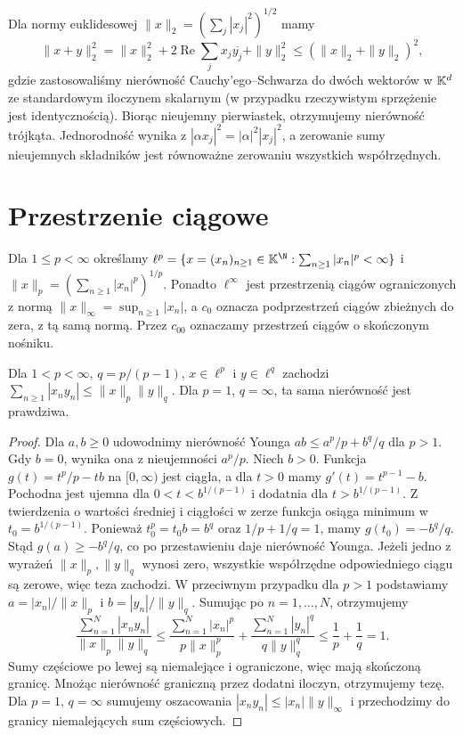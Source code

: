 Dla normy euklidesowej $\|x\|_2=(\sum_j|x_j|^2)^{1/2}$
mamy
\[
 \|x+y\|_2^2
 =\|x\|_2^2+2\operatorname{Re}\sum_j x_j\overline{y_j}
  +\|y\|_2^2
 \le(\|x\|_2+\|y\|_2)^2,
\]
gdzie zastosowaliśmy nierówność Cauchy'ego--Schwarza
do dwóch wektorów w $\mathbb K^d$ ze standardowym iloczynem skalarnym
(w przypadku rzeczywistym sprzężenie jest identycznością).
Biorąc nieujemny pierwiastek, otrzymujemy nierówność trójkąta.
Jednorodność wynika z $|\alpha x_j|^2=|\alpha|^2|x_j|^2$,
a zerowanie sumy nieujemnych składników jest równoważne
zerowaniu wszystkich współrzędnych.

\section{Przestrzenie ciągowe}

\begin{definicja}
\label{def:sequence-spaces12}
Dla $1\le p<\infty$ określamy
$\ell^p=\{x=(x_n)_{n\ge1}\in\K^{\N}:\sum_{n\ge1}|x_n|^p<\infty\}$
i $\|x\|_p=(\sum_{n\ge1}|x_n|^p)^{1/p}$.
Ponadto $\ell^\infty$ jest przestrzenią ciągów ograniczonych
z normą $\|x\|_\infty=\sup_{n\ge1}|x_n|$, a $c_0$ oznacza
podprzestrzeń ciągów zbieżnych do zera, z tą samą normą.
Przez $c_{00}$ oznaczamy przestrzeń ciągów o skończonym nośniku.
\end{definicja}

\begin{lemat}
\label{lem:holder-seq12}
Dla $1<p<\infty$, $q=p/(p-1)$, $x\in\ell^p$ i $y\in\ell^q$
zachodzi
$\sum_{n\ge1}|x_ny_n|\le\|x\|_p\|y\|_q$.
Dla $p=1$, $q=\infty$, ta sama nierówność jest prawdziwa.
\end{lemat}
\begin{proof}
Dla $a,b\ge0$ udowodnimy nierówność Younga
$ab\le a^p/p+b^q/q$ dla $p>1$. Gdy $b=0$, wynika ona z
nieujemności $a^p/p$. Niech $b>0$. Funkcja
$g(t)=t^p/p-tb$ na $[0,\infty)$ jest ciągła, a dla $t>0$
mamy $g'(t)=t^{p-1}-b$. Pochodna jest ujemna dla
$0<t<b^{1/(p-1)}$ i dodatnia dla $t>b^{1/(p-1)}$.
Z twierdzenia o wartości średniej i ciągłości w zerze
funkcja osiąga minimum w $t_0=b^{1/(p-1)}$.
Ponieważ $t_0^p=t_0b=b^q$ oraz $1/p+1/q=1$,
mamy $g(t_0)=-b^q/q$. Stąd $g(a)\ge-b^q/q$,
co po przestawieniu daje nierówność Younga.
Jeżeli jedno z wyrażeń $\|x\|_p,\|y\|_q$ wynosi zero,
wszystkie współrzędne odpowiedniego ciągu są zerowe,
więc teza zachodzi. W przeciwnym przypadku dla $p>1$
podstawiamy $a=|x_n|/\|x\|_p$ i $b=|y_n|/\|y\|_q$.
Sumując po $n=1,\ldots,N$, otrzymujemy
\[
 \frac{\sum_{n=1}^N|x_ny_n|}{\|x\|_p\|y\|_q}
 \le\frac{\sum_{n=1}^N|x_n|^p}{p\|x\|_p^p}
 +\frac{\sum_{n=1}^N|y_n|^q}{q\|y\|_q^q}
 \le\frac1p+\frac1q=1.
\]
Sumy częściowe po lewej są niemalejące i ograniczone,
więc mają skończoną granicę. Mnożąc nierówność graniczną
przez dodatni iloczyn, otrzymujemy tezę.
Dla $p=1$, $q=\infty$ sumujemy oszacowania
$|x_ny_n|\le |x_n|\|y\|_\infty$ i przechodzimy do granicy
niemalejących sum częściowych.
\end{proof}

